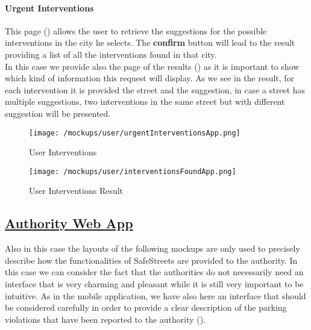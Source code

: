 			\paragraph{Urgent Interventions}
			This page () allows the user to retrieve the suggestions for the possible interventions in the city he selects. The \textbf{confirm} button will lead to the result providing a list of all the interventions found in that city.\\
			
			In this case we provide also the page of the results () as it is important to show which kind of information this request will display. As we see in the result, for each intervention it is provided the street and the suggestion, in case a street has multiple suggestions, two interventions in the same street but with different suggestion will be presented.
			
			\vspace{0.6cm}
			
			\begin{figure}[ht!]
				\centering
				\begin{minipage}{0.5\textwidth}
					\centering
					\texttt{[image: /mockups/user/urgentInterventionsApp.png]}
					\caption{\label{fig:urgentInterventionsApp} User Interventions}
				\end{minipage}\hfill
				\begin{minipage}{0.5\textwidth}
					\centering
					\texttt{[image: /mockups/user/interventionsFoundApp.png]}
					\caption{\label{fig:interventionsFoundApp} User Interventions Result}
				\end{minipage}
			\end{figure}
		
		\subsection[Authority Web App]{\hyperlink{toc}{Authority Web App}}
			\label{sec:authorityWebApp}
			
			Also in this case the layouts of the following mockups are only used to precisely describe how the functionalities of SafeStreets are provided to the authority. In this case we can consider the fact that the authorities do not necessarily need an interface that is very charming and pleasant while it is still very important to be intuitive. As in the mobile application, we have also here an interface that should be considered carefully in order to provide a clear description of the parking violations that have been reported to the authority ().
			
